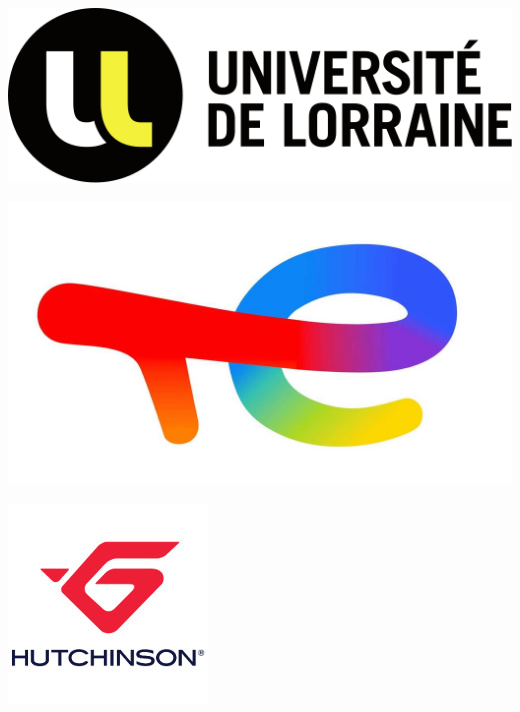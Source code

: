 \documentclass{beamer}
\begin{document}
\begin{frame}
\begin{minipage}{.195\textwidth}
    \end{minipage}%
    \begin{minipage}{.195\textwidth}
        \centering
        \includegraphics[width=.8\linewidth]{img/new_images/UL.png}
    \end{minipage}%
    \begin{minipage}{.195\textwidth}
        \centering
        \includegraphics[width=.6\linewidth]{img/new_images/total_energies.jpg}
    \end{minipage}%
    \begin{minipage}{.195\textwidth}
        \centering
        \includegraphics[width=.6\linewidth]{img/new_images/hutchinson.png}
    \end{minipage}
    
    \vspace{0.5cm}
    
    \end{frame}
    
\end{document}
